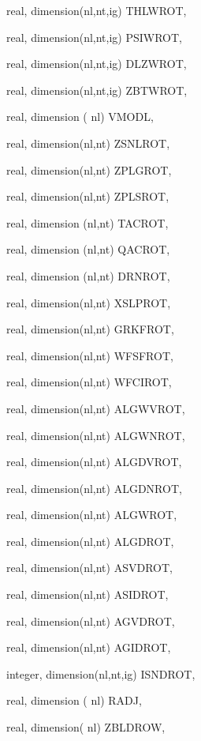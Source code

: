 {\begin{DoxyParamCaption}
\item[{real, dimension(nl,nt,ig)}]{T\+H\+L\+W\+R\+O\+T, }
\item[{real, dimension(nl,nt,ig)}]{P\+S\+I\+W\+R\+O\+T, }
\item[{real, dimension(nl,nt,ig)}]{D\+L\+Z\+W\+R\+O\+T, }
\item[{real, dimension(nl,nt,ig)}]{Z\+B\+T\+W\+R\+O\+T, }
\item[{real, dimension  ( nl)}]{V\+M\+O\+D\+L, }
\item[{real, dimension(nl,nt)}]{Z\+S\+N\+L\+R\+O\+T, }
\item[{real, dimension(nl,nt)}]{Z\+P\+L\+G\+R\+O\+T, }
\item[{real, dimension(nl,nt)}]{Z\+P\+L\+S\+R\+O\+T, }
\item[{real, dimension (nl,nt)}]{T\+A\+C\+R\+O\+T, }
\item[{real, dimension (nl,nt)}]{Q\+A\+C\+R\+O\+T, }
\item[{real, dimension (nl,nt)}]{D\+R\+N\+R\+O\+T, }
\item[{real, dimension(nl,nt)}]{X\+S\+L\+P\+R\+O\+T, }
\item[{real, dimension(nl,nt)}]{G\+R\+K\+F\+R\+O\+T, }
\item[{real, dimension(nl,nt)}]{W\+F\+S\+F\+R\+O\+T, }
\item[{real, dimension(nl,nt)}]{W\+F\+C\+I\+R\+O\+T, }
\item[{real, dimension(nl,nt)}]{A\+L\+G\+W\+V\+R\+O\+T, }
\item[{real, dimension(nl,nt)}]{A\+L\+G\+W\+N\+R\+O\+T, }
\item[{real, dimension(nl,nt)}]{A\+L\+G\+D\+V\+R\+O\+T, }
\item[{real, dimension(nl,nt)}]{A\+L\+G\+D\+N\+R\+O\+T, }
\item[{real, dimension(nl,nt)}]{A\+L\+G\+W\+R\+O\+T, }
\item[{real, dimension(nl,nt)}]{A\+L\+G\+D\+R\+O\+T, }
\item[{real, dimension(nl,nt)}]{A\+S\+V\+D\+R\+O\+T, }
\item[{real, dimension(nl,nt)}]{A\+S\+I\+D\+R\+O\+T, }
\item[{real, dimension(nl,nt)}]{A\+G\+V\+D\+R\+O\+T, }
\item[{real, dimension(nl,nt)}]{A\+G\+I\+D\+R\+O\+T, }
\item[{integer, dimension(nl,nt,ig)}]{I\+S\+N\+D\+R\+O\+T, }
\item[{real, dimension   ( nl)}]{R\+A\+D\+J, }
\item[{real, dimension( nl)}]{Z\+B\+L\+D\+R\+O\+W, }

\end{DoxyParamCaption}}
